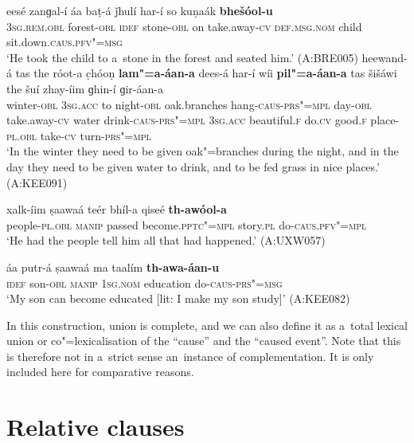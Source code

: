 \ea
\label{ex:13-184}
\gll eesé zanɡal-í áa baṭ-á ǰhulí har-í so kuṇaák \textbf{bhešóol-u}\\
\textsc{3sg.rem.obl} forest-\textsc{obl} \textsc{idef} stone-\textsc{obl} on take.away-\textsc{cv} \textsc{def.msg.nom} child sit.down.\textsc{caus}.\textsc{pfv"=msg}\\
\glt `He took the child to a~stone in the forest and seated him.' (A:BRE005)
\ex
\label{ex:13-185}
\gll heewand-á tas the róot-a c̣hóoṇ \textbf{lam"=a-áan-a} dees-á har-í wíi
\textbf{pil"=a-áan-a} tas šišáwi the šuí zhay-íim  ɡhin-í ɡir-áan-a\\
winter-\textsc{obl}  \textsc{3sg.acc}  to night-\textsc{obl} oak.branches  hang-\textsc{caus}-\textsc{prs"=mpl} day-\textsc{obl} take.away-\textsc{cv} water  drink-\textsc{caus}-\textsc{prs"=mpl} \textsc{3sg.acc} beautiful.\textsc{f} do.\textsc{cv} good.\textsc{f} place-\textsc{pl.obl} take-\textsc{cv} turn-\textsc{prs"=mpl} \\
\glt `In the winter they need to be given oak"=branches during the night, and in the day they need to be given water to drink, and to be fed grass in nice places.' (A:KEE091)

\ex
\label{ex:13-186}
\gll xalk-íim ṣaawaá teér bhíl-a qiseé \textbf{th-awóol-a}\\
people-\textsc{pl.obl} \textsc{manip} passed become.\textsc{pptc"=mpl} story.\textsc{pl} do-\textsc{caus}.\textsc{pfv"=mpl}\\
\glt `He had the people tell him all that had happened.' (A:UXW057)

\ex
\label{ex:13-187}
\gll áa putr-á ṣaawaá ma taalím \textbf{th-awa-áan-u}\\
\textsc{idef} son-\textsc{obl} \textsc{manip} \textsc{1sg.nom} education do-\textsc{caus}-\textsc{prs"=msg}\\
\glt `My son can become educated [lit: I make my son study]' (A:KEE082) 
\z

In this construction,  union is complete, and we can also define it as a~total lexical union \citep[86]{noonan2007} or co"=lexicalisation of the ``cause'' and the ``caused event''. Note that this is therefore not in a~strict sense an~instance of complementation. It is only included here for comparative reasons.


\section{Relative clauses}
\label{sec:13-6}

